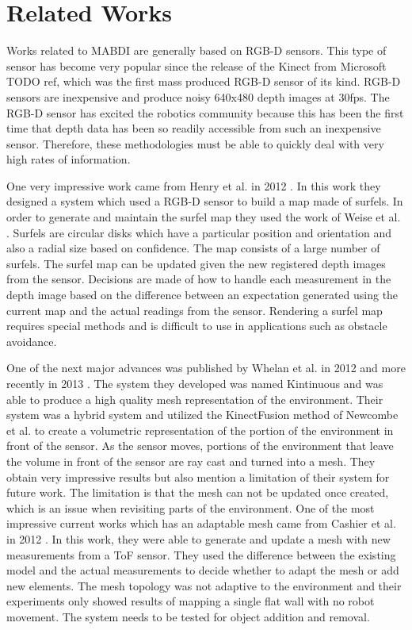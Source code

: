 \section{Related Works}	\label{sec:related_works}

Works related to MABDI are generally based on RGB-D sensors. This type of sensor has
become very popular since the release of the Kinect from Microsoft TODO ref, which
was the first mass produced RGB-D sensor of its kind. RGB-D sensors are
inexpensive and produce noisy 640x480 depth images at 30fps. The RGB-D
sensor has excited the robotics community because this has been the first
time that depth data has been so readily accessible from such an
inexpensive sensor. Therefore, these methodologies must be able to quickly
deal with very high rates of information.

One very impressive work came
from Henry et al. in 2012 \cite{Henry2012}. In this work they designed a
system which used a RGB-D sensor to build a map made of surfels. In order to
generate and maintain the surfel map they used the work of Weise et al.
\cite{Weise2009}. Surfels are circular disks which have a particular
position and orientation and also a radial size based on confidence. The
map consists of a large number of surfels. The surfel map can be updated
given the new registered depth images from the sensor. Decisions are made
of how to handle each measurement in the depth image based on the
difference between an expectation generated using the current map and the
actual readings from the sensor. Rendering a surfel map requires special
methods \cite{Pfister2000} and is difficult to use in applications such as
obstacle avoidance.

One of the next major advances was published by Whelan
et al. in 2012 \cite{Whelan2012} and more recently in 2013
\cite{Whelan12tr}. The system they developed was named Kintinuous and was
able to produce a high quality mesh representation of the environment.
Their system was a hybrid system and utilized the KinectFusion method
\cite{Newcombe2011a} of Newcombe et al. to create a volumetric
representation of the portion of the environment in front of the sensor. As
the sensor moves, portions of the environment that leave the volume in
front of the sensor are ray cast and turned into a mesh. They obtain very
impressive results but also mention a limitation of their system for future
work. The limitation is that the mesh can not be updated once created,
which is an issue when revisiting parts of the environment. One of the most
impressive current works which has an adaptable mesh came from Cashier et
al. in 2012 \cite{Cahier2012}. In this work, they were able to generate and
update a mesh with new measurements from a ToF sensor. They used the
difference between the existing model and the actual measurements to decide
whether to adapt the mesh or add new elements. The mesh topology was not
adaptive to the environment and their experiments only showed results of mapping a
single flat wall with no robot movement. The system needs to be tested for
object addition and removal.

